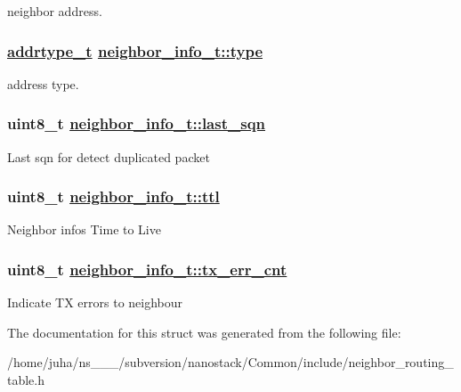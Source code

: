 neighbor address. \hypertarget{structneighbor__info__t_fc0346ec8be9b8c1fd4f30dd92d1668a}{
\subsubsection[type]{\setlength{\rightskip}{0pt plus 5cm}\hyperlink{address_8h_faf76b5591da0abd0584dec411d0551d}{addrtype\_\-t} \hyperlink{structneighbor__info__t_fc0346ec8be9b8c1fd4f30dd92d1668a}{neighbor\_\-info\_\-t::type}}}
\label{structneighbor__info__t_fc0346ec8be9b8c1fd4f30dd92d1668a}


address type. \hypertarget{structneighbor__info__t_5298c5fd0a4147b239272dcb5c842922}{
\subsubsection[last\_\-sqn]{\setlength{\rightskip}{0pt plus 5cm}uint8\_\-t \hyperlink{structneighbor__info__t_5298c5fd0a4147b239272dcb5c842922}{neighbor\_\-info\_\-t::last\_\-sqn}}}
\label{structneighbor__info__t_5298c5fd0a4147b239272dcb5c842922}


Last sqn for detect duplicated packet \hypertarget{structneighbor__info__t_4ca0945404f5041f21776c404fb38c88}{
\subsubsection[ttl]{\setlength{\rightskip}{0pt plus 5cm}uint8\_\-t \hyperlink{structneighbor__info__t_4ca0945404f5041f21776c404fb38c88}{neighbor\_\-info\_\-t::ttl}}}
\label{structneighbor__info__t_4ca0945404f5041f21776c404fb38c88}


Neighbor infos Time to Live \hypertarget{structneighbor__info__t_b830b0bdf5b001e8e554c771f5996004}{
\subsubsection[tx\_\-err\_\-cnt]{\setlength{\rightskip}{0pt plus 5cm}uint8\_\-t \hyperlink{structneighbor__info__t_b830b0bdf5b001e8e554c771f5996004}{neighbor\_\-info\_\-t::tx\_\-err\_\-cnt}}}
\label{structneighbor__info__t_b830b0bdf5b001e8e554c771f5996004}


Indicate TX errors to neighbour 

The documentation for this struct was generated from the following file:\begin{CompactItemize}
\item 
/home/juha/ns\_\_\_/subversion/nanostack/Common/include/neighbor\_\-routing\_\-table.h\end{CompactItemize}
